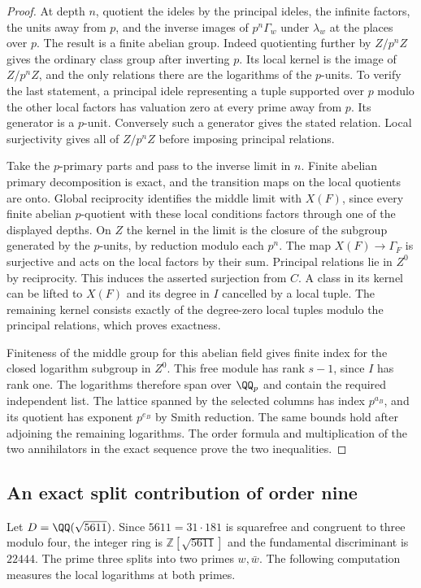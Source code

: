 \documentclass[a4paper,11pt]{article}
\theoremstyle{definition}
\theoremstyle{remark}
\newcommand{\ZZ}{\mathbb Z}\newcommand{\ord}{\operatorname{ord}}
\numberwithin{equation}{section}
\begin{document}
\begin{proof}
At depth \(n\), quotient the ideles by the principal ideles,
the infinite factors, the units away from \(p\), and the
inverse images of \(p^n\Gamma_w\) under \(\lambda_w\) at
the places over \(p\). The result is a finite abelian group.
Indeed quotienting further by \(Z/p^nZ\) gives the ordinary
class group after inverting \(p\). Its local kernel is the
image of \(Z/p^n Z\), and the only relations there are
the logarithms of the \(p\)-units. To verify the last
statement, a principal idele representing a tuple supported
over \(p\) modulo the other local factors has valuation
zero at every prime away from \(p\). Its generator is a
\(p\)-unit. Conversely such a generator gives the stated
relation. Local surjectivity gives all of \(Z/p^n Z\)
before imposing principal relations.

Take the \(p\)-primary parts and pass to the inverse limit
in \(n\). Finite abelian primary decomposition is exact,
and the transition maps on the local quotients are onto.
Global reciprocity identifies the middle limit with \(X(F)\),
since every finite abelian \(p\)-quotient with these local
conditions factors through one of the displayed depths.
On \(Z\) the kernel in the limit is the closure of the
subgroup generated by the \(p\)-units, by reduction modulo
each \(p^n\). The map \(X(F)\to\Gamma_F\) is surjective
and acts on the local factors by their sum. Principal
relations lie in \(Z^0\) by reciprocity. This induces the
asserted surjection from \(C\). A class in its kernel can
be lifted to \(X(F)\) and its degree in \(I\) cancelled
by a local tuple. The remaining kernel consists exactly of
the degree-zero local tuples modulo the principal relations,
which proves exactness.

Finiteness of the middle group for this abelian field gives
finite index for the closed logarithm subgroup in \(Z^0\).
This free module has rank \(s-1\), since \(I\) has rank
one. The logarithms therefore span over \(\QQ_p\) and
contain the required independent list. The lattice spanned
by the selected columns has index \(p^{a_B}\), and its
quotient has exponent \(p^{e_B}\) by Smith reduction.
The same bounds hold after adjoining the remaining
logarithms. The order formula and multiplication of the
two annihilators in the exact sequence prove the two
inequalities.
\end{proof}

\subsection{An exact split contribution of order nine}\label{nav:I-80}
Let \(D=\QQ(\sqrt{5611})\). Since \(5611=31\cdot181\)
is squarefree and congruent to three modulo four, the
integer ring is \(\ZZ[\sqrt{5611}]\) and the fundamental
discriminant is \(22444\). The prime three splits into
two primes \(w,\bar w\). The following computation
measures the local logarithms at both primes.
\end{document}
